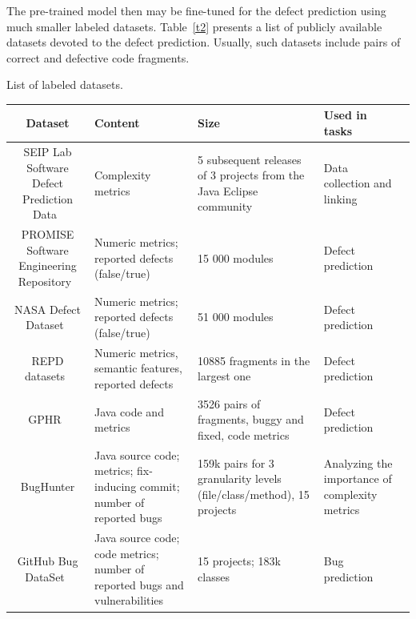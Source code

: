 \documentclass[mathematics,review,submit,moreauthors,pdftex]{Definitions/mdpi}
\begin{document}


The pre-trained model then may be fine-tuned for the defect prediction using much smaller labeled datasets. Table~\ref{t2} presents a list of publicly available datasets devoted to the defect prediction. Usually, such datasets include pairs of correct and defective code fragments. 

\begin{specialtable}[H] 
\caption{List of labeled datasets.\label{t2}}
\renewcommand{\arraystretch}{2.0}
\begin{tabulary}{.7\textwidth}{CLLLl}
\toprule
\textbf{Dataset}	& \textbf{Content}	& \textbf{Size}  & \parbox{10em}{\textbf{Used in tasks}}\\
\midrule
SEIP Lab Software Defect Prediction Data~\cite{mauvsa2016systematic} & Complexity metrics & 5 subsequent releases of 3 projects from the   Java Eclipse community & Data collection and linking \\
PROMISE Software Engineering Repository~\cite{sayyad2005promise} & Numeric metrics; reported defects (false/true) & 15 000 modules & Defect prediction \\
NASA Defect Dataset~\cite{shepperd2018nasa} & Numeric metrics; reported defects (false/true) & 51 000 modules & Defect prediction \\
REPD datasets~\cite{AfricEtAl2020} & Numeric metrics, semantic features, reported defects & 10885 fragments in the largest one & Defect prediction \\
GPHR~\cite{ghpr2020} & Java code and metrics & 3526 pairs of fragments, buggy and fixed, code metrics & Defect prediction \\
BugHunter\cite{FerencEtAl2020} & Java source code; metrics; fix-inducing commit; number of reported bugs & 159k pairs for 3 granularity levels (file/class/method), 15 projects & Analyzing the importance of complexity   metrics \\
GitHub Bug DataSet~\cite{ferenc2016github_bug} & Java source code; code metrics; number of reported bugs and vulnerabilities & 15 projects; 183k classes & Bug prediction \\

\end{tabulary}
\end{specialtable}
\end{document}
